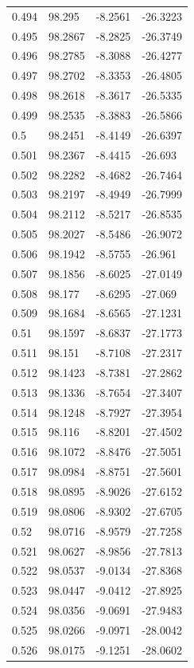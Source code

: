 \begin{tabular}{llll}
0.494 & 98.295 & -8.2561 & -26.3223 \\
0.495 & 98.2867 & -8.2825 & -26.3749 \\
0.496 & 98.2785 & -8.3088 & -26.4277 \\
0.497 & 98.2702 & -8.3353 & -26.4805 \\
0.498 & 98.2618 & -8.3617 & -26.5335 \\
0.499 & 98.2535 & -8.3883 & -26.5866 \\
0.5 & 98.2451 & -8.4149 & -26.6397 \\
0.501 & 98.2367 & -8.4415 & -26.693 \\
0.502 & 98.2282 & -8.4682 & -26.7464 \\
0.503 & 98.2197 & -8.4949 & -26.7999 \\
0.504 & 98.2112 & -8.5217 & -26.8535 \\
0.505 & 98.2027 & -8.5486 & -26.9072 \\
0.506 & 98.1942 & -8.5755 & -26.961 \\
0.507 & 98.1856 & -8.6025 & -27.0149 \\
0.508 & 98.177 & -8.6295 & -27.069 \\
0.509 & 98.1684 & -8.6565 & -27.1231 \\
0.51 & 98.1597 & -8.6837 & -27.1773 \\
0.511 & 98.151 & -8.7108 & -27.2317 \\
0.512 & 98.1423 & -8.7381 & -27.2862 \\
0.513 & 98.1336 & -8.7654 & -27.3407 \\
0.514 & 98.1248 & -8.7927 & -27.3954 \\
0.515 & 98.116 & -8.8201 & -27.4502 \\
0.516 & 98.1072 & -8.8476 & -27.5051 \\
0.517 & 98.0984 & -8.8751 & -27.5601 \\
0.518 & 98.0895 & -8.9026 & -27.6152 \\
0.519 & 98.0806 & -8.9302 & -27.6705 \\
0.52 & 98.0716 & -8.9579 & -27.7258 \\
0.521 & 98.0627 & -8.9856 & -27.7813 \\
0.522 & 98.0537 & -9.0134 & -27.8368 \\
0.523 & 98.0447 & -9.0412 & -27.8925 \\
0.524 & 98.0356 & -9.0691 & -27.9483 \\
0.525 & 98.0266 & -9.0971 & -28.0042 \\
0.526 & 98.0175 & -9.1251 & -28.0602 \\

\end{tabular}
